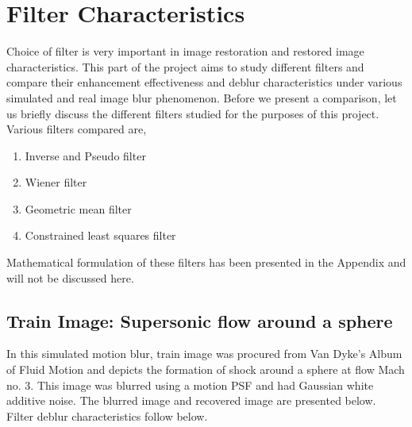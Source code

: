 \graphicspath{{mehul_pics/}}%

\chapter{Filter Characteristics}
 Choice of filter is very important in image restoration and restored image characteristics. This part of the project aims to study different filters and compare their enhancement effectiveness and deblur characteristics under various simulated and real image blur phenomenon. Before we present a comparison, let us briefly discuss the different filters studied for the purposes of this project. Various filters compared are, 
\begin{enumerate}
\item Inverse and Pseudo filter
\item Wiener filter
\item Geometric mean filter
\item Constrained least squares filter
\end{enumerate} 
Mathematical formulation of these filters has been presented in the Appendix and will not be discussed here. 
\section{Train Image: Supersonic flow around a sphere}
In this simulated motion blur, train image was procured from Van Dyke's Album of Fluid Motion and depicts the formation of shock around a sphere at flow Mach no. 3. This image was blurred using a motion PSF and had Gaussian white additive noise. The blurred image and recovered image are presented below. Filter deblur characteristics follow below.

